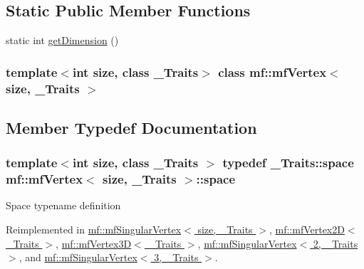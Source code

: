 \subsection*{Static Public Member Functions}
\begin{DoxyCompactItemize}
\item 
static int \hyperlink{classmf_1_1mfVertex_a6698049cfa3351294d3f96a3779af628}{getDimension} ()
\end{DoxyCompactItemize}
\subsubsection*{template$<$int size, class \_\-Traits$>$ class mf::mfVertex$<$ size, \_\-Traits $>$}



\subsection{Member Typedef Documentation}
\hypertarget{classmf_1_1mfVertex_a9710b0b7ac7bbb276e1e97d541cbfc93}{
\subsubsection[{space}]{\setlength{\rightskip}{0pt plus 5cm}template$<$int size, class \_\-Traits $>$ typedef \_\-Traits::space {\bf mf::mfVertex}$<$ size, \_\-Traits $>$::{\bf space}}}
\label{classmf_1_1mfVertex_a9710b0b7ac7bbb276e1e97d541cbfc93}
Space typename definition 

Reimplemented in \hyperlink{classmf_1_1mfSingularVertex_a96d4909dd62a8e8889eda76d0148db2a}{mf::mfSingularVertex$<$ size, \_\-Traits $>$}, \hyperlink{classmf_1_1mfVertex2D_a0730a219bea43b0b049cae2b4c72527b}{mf::mfVertex2D$<$ \_\-Traits $>$}, \hyperlink{classmf_1_1mfVertex3D_a16aa06a4ca21fae048fa56b7a40ac088}{mf::mfVertex3D$<$ \_\-Traits $>$}, \hyperlink{classmf_1_1mfSingularVertex_a96d4909dd62a8e8889eda76d0148db2a}{mf::mfSingularVertex$<$ 2, \_\-Traits $>$}, and \hyperlink{classmf_1_1mfSingularVertex_a96d4909dd62a8e8889eda76d0148db2a}{mf::mfSingularVertex$<$ 3, \_\-Traits $>$}.




